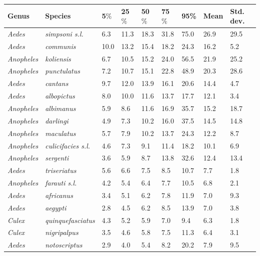 \documentclass[12pt]{article}
\begin{document}
\begin{table}[htbp]
	\begin{tabular}{l|l|l|l|l|l|l|l|l}
		\textbf{Genus} & \textbf{Species} & \textbf{5$\%$} & \textbf{25$\%$} & \textbf{50$\%$} & \textbf{75$\%$} & \textbf{95\%} &  \textbf{Mean} & \textbf{Std. dev.}\\
		\hline
		\textit{Aedes} & \textit{simpsoni s.l.} & 6.3 & 11.3 & 18.3 & 31.8 & 75.0 & 26.9 & 29.5 \\
		\textit{Aedes} & \textit{communis} & 10.0 & 13.2 & 15.4 & 18.2 & 24.3 & 16.2 & 5.2 \\
		\textit{Anopheles} & \textit{koliensis} & 6.7 & 10.5 & 15.2 & 24.0 & 56.5 & 21.9 & 25.2 \\
		\textit{Anopheles} & \textit{punctulatus} & 7.2 & 10.7 & 15.1 & 22.8 & 48.9 & 20.3 & 28.6 \\
		\textit{Aedes} & \textit{cantans} & 9.7 & 12.0 & 13.9 & 16.1 & 20.6 & 14.4 & 4.7 \\
		\textit{Aedes} & \textit{albopictus} & 8.0 & 10.0 & 11.6 & 13.7 & 17.7 & 12.1 & 3.4 \\
		\textit{Anopheles} & \textit{albimanus} & 5.9 & 8.6 & 11.6 & 16.9 & 35.7 & 15.2 & 18.7 \\
		\textit{Anopheles} & \textit{darlingi} & 4.9 & 7.3 & 10.2 & 16.0 & 37.5 & 14.5 & 14.8 \\
		\textit{Anopheles} & \textit{maculatus} & 5.7 & 7.9 & 10.2 & 13.7 & 24.3 & 12.2 & 8.7 \\
		\textit{Anopheles} & \textit{culicifacies s.l.} & 4.6 & 7.3 & 9.1 & 11.4 & 18.2 & 10.1 & 6.9 \\
		\textit{Anopheles} & \textit{sergenti} & 3.6 & 5.9 & 8.7 & 13.8 & 32.6 & 12.4 & 13.4 \\
		\textit{Aedes} & \textit{triseriatus} & 5.6 & 6.6 & 7.5 & 8.5 & 10.7 & 7.7 & 1.8 \\
		\textit{Anopheles} & \textit{farauti s.l.} & 4.2 & 5.4 & 6.4 & 7.7 & 10.5 & 6.8 & 2.1 \\
		\textit{Aedes} & \textit{africanus} & 3.4 & 5.1 & 6.2 & 7.8 & 11.9 & 7.0 & 9.3 \\
		\textit{Aedes} & \textit{aegypti} & 2.8 & 4.5 & 6.2 & 8.5 & 13.9 & 7.0 & 3.8 \\
		\textit{Culex} & \textit{quinquefasciatus} & 4.3 & 5.2 & 5.9 & 7.0 & 9.4 & 6.3 & 1.8 \\
		\textit{Culex} & \textit{nigripalpus} & 3.5 & 4.6 & 5.8 & 7.5 & 11.3 & 6.4 & 3.1 \\
		\textit{Aedes} & \textit{notoscriptus} & 2.9 & 4.0 & 5.4 & 8.2 & 20.2 & 7.9 & 9.5 \\

\end{tabular}
\end{table}
\end{document}
